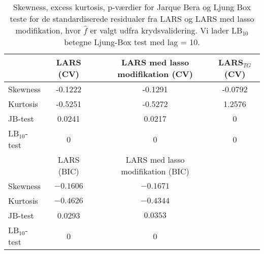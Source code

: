 \begin{table}
\center
\begin{tabular}{lcccc} 
\toprule
& LARS (CV) && LARS med lasso modifikation (CV) & LARS$_{TG}$ (CV) \\ \midrule
Skewness & -0.1222 && -0.1291 & -0.0792   \\
Kurtosis & -0.5251  && -0.5272 & 1.2576 \\
JB-test & 0.0241 &&  0.0217 & 0 \\
LB$_{10}$-test &0 && 0  & 0  \\  \bottomrule \toprule
& LARS (BIC) && LARS med lasso modifikation (BIC)\\ \midrule
Skewness & $-0.1606$  && $-0.1671$    \\
Kurtosis &   $-0.4626$ && $-0.4344 $ \\
JB-test & 0.0293 &&  $0.0353$ \\
LB$_{10}$-test & 0 && 0  \\  \bottomrule 
\end{tabular}
\caption{Skewness, excess kurtosis, p-værdier for Jarque Bera og Ljung Box teste for de standardiserede residualer fra LARS og LARS med lasso modifikation, hvor  $\widehat{f}$ er valgt udfra krydsvalidering. Vi lader LB$_{10}$ betegne Ljung-Box test med lag = 10. } \label{tab:lars_kryds_res_tab}
\end{table}